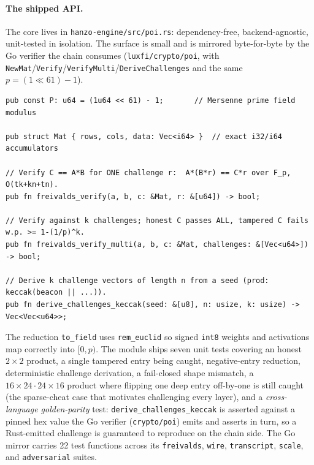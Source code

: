 \documentclass[11pt]{article}
\newcommand{\code}[1]{\texttt{#1}}
\begin{document}
\paragraph{The shipped API.}
The core lives in \code{hanzo-engine/src/poi.rs}: dependency-free, backend-agnostic,
unit-tested in isolation. The surface is small and is mirrored byte-for-byte by
the Go verifier the chain consumes (\code{luxfi/crypto/poi}, with
\code{NewMat}/\code{Verify}/\code{VerifyMulti}/\code{DeriveChallenges} and the
same $p = (1\ll 61)-1$).

\begin{lstlisting}[language={}]
pub const P: u64 = (1u64 << 61) - 1;       // Mersenne prime field modulus

pub struct Mat { rows, cols, data: Vec<i64> }  // exact i32/i64 accumulators

// Verify C == A*B for ONE challenge r:  A*(B*r) == C*r over F_p, O(tk+kn+tn).
pub fn freivalds_verify(a, b, c: &Mat, r: &[u64]) -> bool;

// Verify against k challenges; honest C passes ALL, tampered C fails w.p. >= 1-(1/p)^k.
pub fn freivalds_verify_multi(a, b, c: &Mat, challenges: &[Vec<u64>]) -> bool;

// Derive k challenge vectors of length n from a seed (prod: keccak(beacon || ...)).
pub fn derive_challenges_keccak(seed: &[u8], n: usize, k: usize) -> Vec<Vec<u64>>;
\end{lstlisting}

The reduction \code{to\_field} uses \code{rem\_euclid} so signed \code{int8}
weights and activations map correctly into $[0,p)$. The module ships seven unit
tests covering an honest $2\times 2$ product, a single tampered entry being
caught, negative-entry reduction, deterministic challenge derivation, a
fail-closed shape mismatch, a $16{\times}24\cdot 24{\times}16$ product where
flipping one deep entry off-by-one is still caught (the sparse-cheat case that
motivates challenging every layer), and a \emph{cross-language golden-parity}
test: \code{derive\_challenges\_keccak} is asserted against a pinned hex value the
Go verifier (\code{crypto/poi}) emits and asserts in turn, so a Rust-emitted
challenge is guaranteed to reproduce on the chain side. The Go mirror carries 22
test functions across its \code{freivalds}, \code{wire}, \code{transcript},
\code{scale}, and \code{adversarial} suites.
\end{document}
